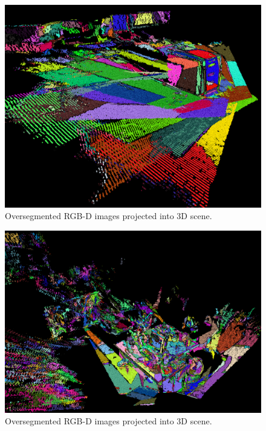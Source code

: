 \documentclass[10pt,letterpaper]{article}
\begin{document}



\begin{figure}[ht]
\begin{center}
	\includegraphics[width=.4\linewidth]{OverSegmented2.png}
\end{center}
\caption{Oversegmented RGB-D images projected into 3D scene.}
\label{fig:overseg2}
\end{figure}

\begin{figure}[ht]
\begin{center}
	\includegraphics[width=.4\linewidth]{OverSegmented3.png}
\end{center}
\caption{Oversegmented RGB-D images projected into 3D scene.}
\label{fig:overseg3}
\end{figure}
\end{document}
